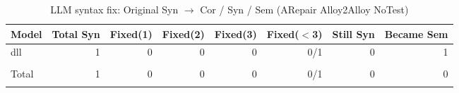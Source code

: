 \begin{table}[h]
\centering
\caption{LLM syntax fix: Original Syn $\rightarrow$ Cor / Syn / Sem (ARepair Alloy2Alloy NoTest)}
\label{tab:syn_fix_arepairalloy2alloynotest}
\begin{tabular}{|l|r|r|r|r|r|r|r|}
\hline
Model & Total Syn & Fixed(1) & Fixed(2) & Fixed(3) & Fixed($<$3) & Still Syn & Became Sem \\
\hline
dll & 1 & 0 & 0 & 0 & 0/1 & 0 & 1 \\\\
\hline
Total & 1 & 0 & 0 & 0 & 0/1 & 0 & 0 \\\\
\hline
\end{tabular}
\end{table}
